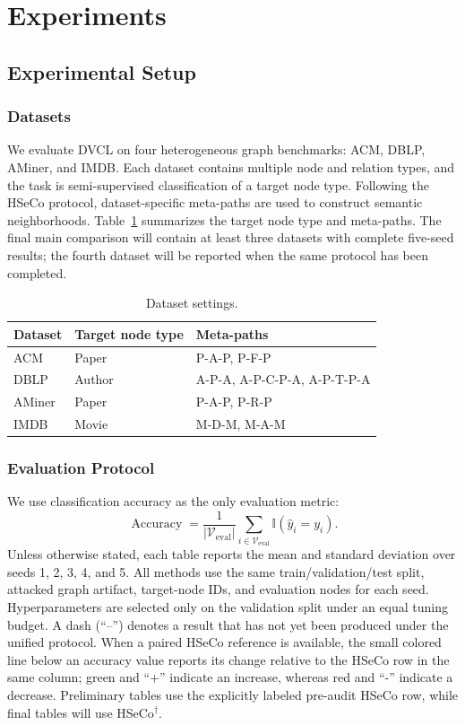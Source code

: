 \section{Experiments}

\subsection{Experimental Setup}

\subsubsection{Datasets}

We evaluate DVCL on four heterogeneous graph benchmarks: ACM, DBLP, AMiner, and IMDB. Each dataset contains multiple node and relation types, and the task is semi-supervised classification of a target node type. Following the HSeCo protocol, dataset-specific meta-paths are used to construct semantic neighborhoods. Table~\ref{tab:dataset_settings} summarizes the target node type and meta-paths. The final main comparison will contain at least three datasets with complete five-seed results; the fourth dataset will be reported when the same protocol has been completed.

\begin{table}[htbp]
\centering
\caption{Dataset settings.}
\label{tab:dataset_settings}
\begin{tabular}{lll}
\toprule
Dataset & Target node type & Meta-paths \\
\midrule
ACM & Paper & P-A-P, P-F-P \\
DBLP & Author & A-P-A, A-P-C-P-A, A-P-T-P-A \\
AMiner & Paper & P-A-P, P-R-P \\
IMDB & Movie & M-D-M, M-A-M \\
\bottomrule
\end{tabular}
\end{table}

\subsubsection{Evaluation Protocol}

We use classification accuracy as the only evaluation metric:
\begin{equation}
\operatorname{Accuracy}
=\frac{1}{|\mathcal{V}_{\mathrm{eval}}|}
\sum_{i\in\mathcal{V}_{\mathrm{eval}}}
\mathbb{I}(\hat{y}_i=y_i).
\end{equation}
Unless otherwise stated, each table reports the mean and standard deviation over seeds 1, 2, 3, 4, and 5. All methods use the same train/validation/test split, attacked graph artifact, target-node IDs, and evaluation nodes for each seed. Hyperparameters are selected only on the validation split under an equal tuning budget. A dash (``--'') denotes a result that has not yet been produced under the unified protocol. When a paired HSeCo reference is available, the small colored line below an accuracy value reports its change relative to the HSeCo row in the same column; green and ``+'' indicate an increase, whereas red and ``-'' indicate a decrease. Preliminary tables use the explicitly labeled pre-audit HSeCo row, while final tables will use HSeCo$^{\dagger}$.

